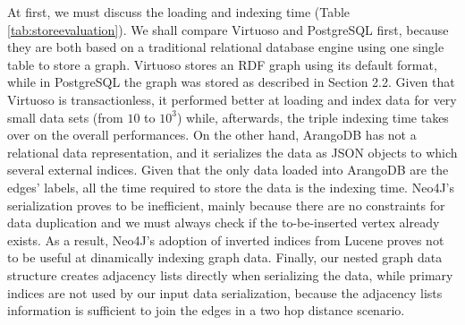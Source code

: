 At first, we must discuss the  loading and indexing time (Table \ref{tab:storeevaluation}). We shall  compare Virtuoso and PostgreSQL first, because they are both based on a traditional relational database engine using one single table to store a graph. Virtuoso  stores an RDF graph using its default format, while in PostgreSQL the graph was stored as described in Section 2.2. Given that Virtuoso is transactionless, it performed better at loading and index data for very small data sets (from $10$ to $10^3$) while, afterwards, the triple indexing time takes over on the overall performances. On the other hand, ArangoDB has not a relational data representation, and it  serializes the data as JSON objects to which several external indices. Given that the only data loaded into ArangoDB are the edges' labels, all the time required to store the data is the indexing time. Neo4J's serialization proves to be inefficient, mainly because there are no constraints for data duplication and we must always check if the to-be-inserted vertex already exists. As a result, Neo4J's adoption of inverted indices from Lucene proves not to be useful at dinamically indexing graph data. Finally, our nested graph data structure creates adjacency lists directly when serializing the data, while primary indices are not used by our input data serialization, because the adjacency lists information is sufficient to join the edges in a two hop distance scenario.

